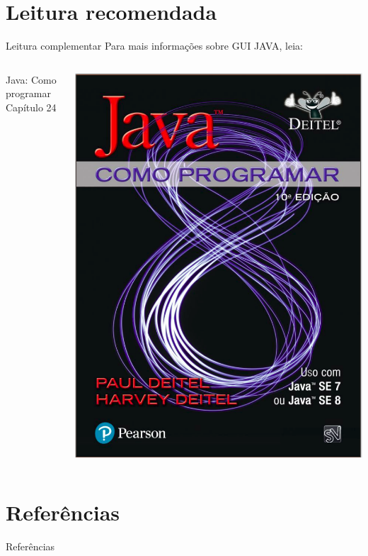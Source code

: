 \documentclass[11pt,aspectratio=43,ignorenonframetext,t]{beamer}
\begin{document}
\section{Leitura recomendada}
\begin{frame}{Leitura complementar}
 Para mais informações sobre GUI JAVA, leia:\\
 \begin{columns}
   \begin{column}{0.4\textwidth}
     Java: Como programar\\
     Capítulo 24\\ 
      \cite{deitel2017java}
   \end{column}
   \begin{column}{0.3\textwidth}
    \begin{center}
  \includegraphics[height=0.5\paperheight]{fig/aula1/deitel2017java.png} \\
 \end{center}
   \end{column}
 \end{columns}
\end{frame}
\section{Referências}

\begin{frame}{Referências}%
\small
\begin{center}
\tiny


\end{center}
\end{frame}
\setcounter{framenumber}{\thelastpagemainpart}
\end{document}
